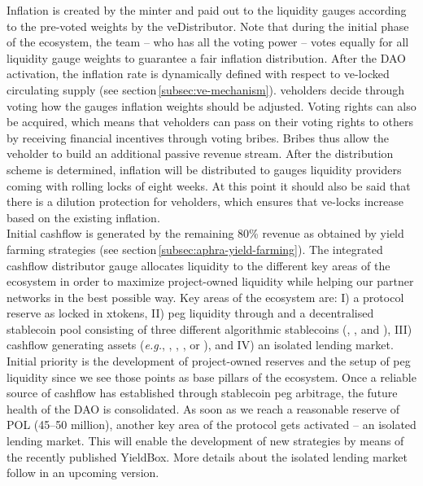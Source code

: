 Inflation is created by the \aphra minter and paid out to the liquidity gauges according to the pre-voted weights by the veDistributor.
Note that during the initial phase of the ecosystem, the \aphra team -- who has all the voting power -- votes equally for all liquidity gauge weights to guarantee a fair inflation distribution. 
After the DAO activation, the inflation rate is dynamically defined with respect to ve-locked circulating supply (see section\,\ref{subsec:ve-mechanism}).
ve\aphra holders decide through voting how the gauges inflation weights should be adjusted.
Voting rights can also be acquired, which means that ve\aphra holders can pass on their voting rights to others by receiving financial incentives through voting bribes.
Bribes thus allow the ve\aphra holder to build an additional passive revenue stream.
After the distribution scheme is determined, inflation will be distributed to gauges liquidity providers coming with rolling locks of eight weeks.
At this point it should also be said that there is a dilution protection for ve\aphra holders, which ensures that ve-locks increase based on the existing inflation.\\[-1em]

Initial cashflow is generated by the remaining 80\% revenue as obtained by \aphra yield farming strategies (see section\,\ref{subsec:aphra-yield-farming}).
The integrated cashflow distributor gauge allocates liquidity to the different key areas of the ecosystem in order to maximize project-owned liquidity while helping our partner networks in the best possible way.
Key areas of the ecosystem are: I) a protocol reserve as locked in x\vader tokens, II) peg liquidity through \crv and a decentralised stablecoin pool consisting of three different algorithmic stablecoins (\usdv,\cite{vader} \bean,\cite{bean} and \frax\cite{frax}), III) cashflow generating assets (\textit{e.g.}, \crv,\cite{curve} \fxs,\cite{frax} \rpl,\cite{rocket-pool} or \yfi\cite{yearn-finance}), and IV) an isolated lending market. 
Initial priority is the development of project-owned reserves and the setup of peg liquidity since we see those points as base pillars of the ecosystem.
Once a reliable source of cashflow has established through stablecoin peg arbitrage, the future health of the \aphra DAO is consolidated.
As soon as we reach a reasonable reserve of POL (45--50 million), another key area of the protocol gets activated -- an isolated lending market.
This will enable the development of new strategies by means of the recently published YieldBox.\cite{yieldbox,boringcrypto}
More details about the isolated lending market follow in an upcoming version.

